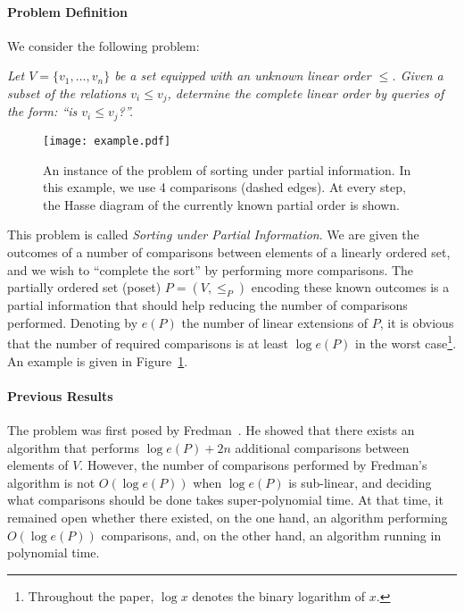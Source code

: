 \documentclass{article} \usepackage{fullpage}
\begin{document}
\paragraph*{Problem Definition}

We consider the following problem:\medskip

{\it Let $V = \{ v_1 , \ldots, v_n \}$ be a set equipped with an unknown linear order $\leqslant$. Given a subset of the relations $v_i \leqslant v_j$, determine the complete linear order by queries of the form: ``is $v_i \leqslant v_j$?''.}\medskip

\begin{figure}
\begin{center}
\texttt{[image: example.pdf]}
\end{center}
\caption{\label{fig:example}An instance of the problem of sorting under partial information. In this example, we use 4 comparisons (dashed edges). At every step, the Hasse diagram of the currently known partial order is shown.}
\end{figure}

This problem is called {\it Sorting under Partial Information}. We are given the outcomes of a number of comparisons between elements of a linearly ordered set, and we wish to ``complete the sort'' by performing more comparisons. The partially ordered set (poset) $P = (V,\leqslant_P)$ encoding these known outcomes is a partial information that should help reducing the number of comparisons performed. Denoting by $e(P)$ the number of linear extensions of $P$, it is obvious that the number of required comparisons is at least $\log e(P)$ in the worst case\footnote{Throughout the paper, $\log x$ denotes the binary logarithm of $x$.}. An example is given in Figure~\ref{fig:example}.

\paragraph*{Previous Results}

The problem was first posed by Fredman~\cite{F76}. He showed that there exists an algorithm that performs $\log e(P) + 2n$ additional comparisons between elements of $V$. However, the number of comparisons performed by Fredman's algorithm is not $O(\log e(P))$ when $\log e(P)$ is sub-linear, and deciding what comparisons should be done takes super-polynomial time. At that time, it remained open whether there existed, on the one hand, an algorithm performing $O(\log e(P))$ comparisons, and, on the other hand, an algorithm running in polynomial time.
\end{document}
